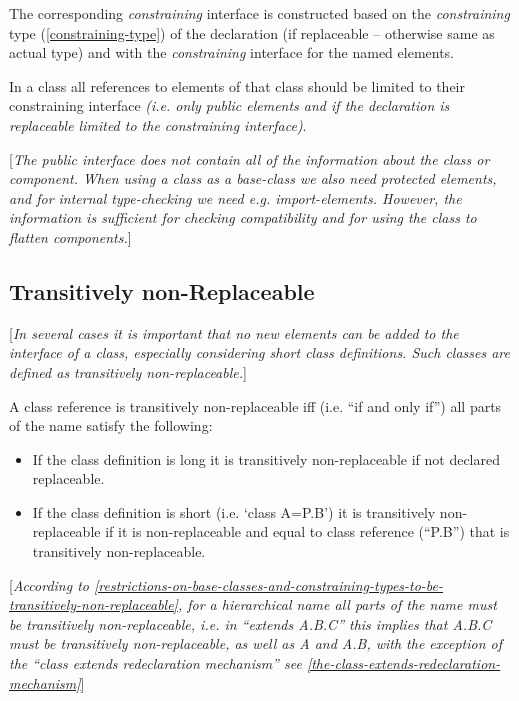 \documentclass[10pt,a4paper]{report}
\def\doublelabel#1{\label{#1}}
\begin{document}
The corresponding \emph{constraining} interface is constructed based on
the \emph{constraining} type (\ref{constraining-type}) of the declaration (if
replaceable -- otherwise same as actual type) and with the
\emph{constraining} interface for the named elements.

In a class all references to elements of that class should be limited to
their constraining interface \emph{(i.e. only public elements and if the
declaration is replaceable limited to the constraining interface)}.

{[}\emph{The public interface does not contain all of the information
about the class or component. When using a class as a base-class we also
need protected elements, and for internal type-checking we need e.g.
import-elements. However, the information is sufficient for checking
compatibility and for using the class to flatten components.}{]}

\subsection{Transitively non-Replaceable}\doublelabel{transitively-non-replaceable}

{[}\emph{In several cases it is important that no new elements can be
added to the interface of a class, especially considering short class
definitions. Such classes are defined as transitively
non-replaceable.}{]}

A class reference is transitively non-replaceable iff (i.e. ``if and
only if'') all parts of the name satisfy the following:

\begin{itemize}
\item
  If the class definition is long it is transitively non-replaceable if
  not declared replaceable.
\item
  If the class definition is short (i.e. `class A=P.B') it is
  transitively non-replaceable if it is non-replaceable and equal to
  class reference (``P.B'') that is transitively non-replaceable.
\end{itemize}

{[}\emph{According to \ref{restrictions-on-base-classes-and-constraining-types-to-be-transitively-non-replaceable}, for a hierarchical name all
parts of the name must be transitively non-replaceable, i.e. in
``extends A.B.C'' this implies that A.B.C must be transitively
non-replaceable, as well as A and A.B, with the exception of the ``class
extends redeclaration mechanism'' see \ref{the-class-extends-redeclaration-mechanism}}{]}
\end{document}
